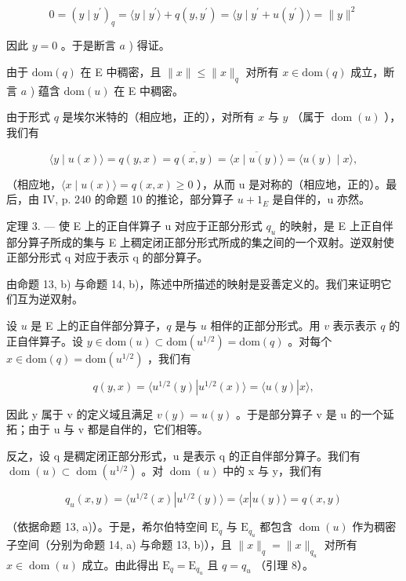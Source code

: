 \[
0 = (y \mid y ^ {\prime}) _ {q} = \langle y \mid y ^ {\prime} \rangle + q (y, y ^ {\prime}) = \langle y \mid y ^ {\prime} + u (y ^ {\prime}) \rangle = \| y \| ^ {2}
\]

因此 \(y = 0\) 。于是断言 \(a\) ) 得证。

由于 \(\mathrm{dom}(q)\) 在 E 中稠密，且 \(\| x\| \leqslant \| x\| _q\) 对所有 \(x\in \mathrm{dom}(q)\) 成立，断言 \(a\) ) 蕴含 \(\mathrm{dom}(u)\) 在 E 中稠密。

由于形式 \(q\) 是埃尔米特的（相应地，正的），对所有 \(x\) 与 \(y\) （属于 \(\operatorname{dom}(u)\) ），我们有

\[
\langle y \mid u (x) \rangle = q (y, x) = \overline {{q (x , y)}} = \overline {{\langle x \mid u (y) \rangle}} = \langle u (y) \mid x \rangle ,
\]

（相应地，\(\langle x \mid u(x) \rangle = q(x, x) \geqslant 0\) ），从而 u 是对称的（相应地，正的）。最后，由 IV, p. 240 的命题 10 的推论，部分算子 \(u + 1_{E}\) 是自伴的，u 亦然。

定理 3. --- 使 E 上的正自伴算子 u 对应于正部分形式 \(q_u\) 的映射，是 E 上正自伴部分算子所成的集与 E 上稠定闭正部分形式所成的集之间的一个双射。逆双射使正部分形式 q 对应于表示 q 的部分算子。

由命题 13, b) 与命题 14, b)，陈述中所描述的映射是妥善定义的。我们来证明它们互为逆双射。

设 \(u\) 是 E 上的正自伴部分算子，\(q\) 是与 \(u\) 相伴的正部分形式。用 \(v\) 表示表示 \(q\) 的正自伴算子。设 \(y \in \mathrm{dom}(u) \subset \mathrm{dom}(u^{1/2}) = \mathrm{dom}(q)\) 。对每个 \(x \in \mathrm{dom}(q) = \mathrm{dom}(u^{1/2})\) ，我们有

\[
q (y, x) = \langle u ^ {1 / 2} (y) | u ^ {1 / 2} (x) \rangle = \langle u (y) | x \rangle ,
\]

因此 y 属于 v 的定义域且满足 \(v(y) = u(y)\) 。于是部分算子 v 是 u 的一个延拓；由于 u 与 v 都是自伴的，它们相等。

反之，设 q 是稠定闭正部分形式，u 是表示 q 的正自伴部分算子。我们有 \(\operatorname{dom}(u) \subset \operatorname{dom}(u^{1/2})\) 。对 \(\operatorname{dom}(u)\) 中的 x 与 y，我们有

\[
q _ {u} (x, y) = \langle u ^ {1 / 2} (x) | u ^ {1 / 2} (y) \rangle = \langle x | u (y) \rangle = q (x, y)
\]

（依据命题 13, a)）。于是，希尔伯特空间 \(\mathrm{E}_q\) 与 \(\mathrm{E}_{q_u}\) 都包含 \(\operatorname{dom}(u)\) 作为稠密子空间（分别为命题 14, a) 与命题 13, b)），且 \(\|x\|_q = \|x\|_{q_u}\) 对所有 \(x \in \operatorname{dom}(u)\) 成立。由此得出 \(\mathrm{E}_q = \mathrm{E}_{q_u}\) 且 \(q = q_u\) （引理 8）。

